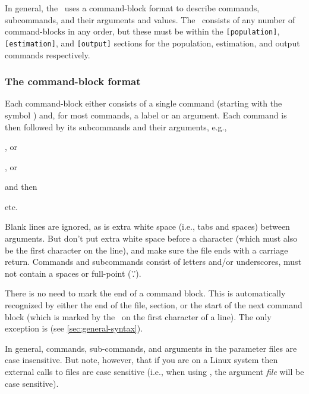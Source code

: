 In general, the \config\ uses a command-block format to describe commands, subcommands, and their arguments and values. The \config\ consists of any number of command-blocks in any order, but these must be within the \texttt{[population]}, \texttt{[estimation]}, and  \texttt{[output]} sections for the population, estimation, and output commands respectively. 

\subsubsection{The command-block format}

Each command-block either consists of a single command (starting with the symbol \@) and, for most commands, a label or an argument. Each command is then followed by its subcommands and their arguments, e.g., 

\begin{description}
\item {}, or 
\item {}, or
\item {}
\end{description}

and then
\begin{description}
\item {}
\item {}
\item etc.
\end{description}

Blank lines are ignored, as is extra white space (i.e., tabs and spaces) between arguments. But don't put extra white space before a \command{} character (which must also be the first character on the line), and make sure the file ends with a carriage return. Commands and subcommands consist of letters and/or underscores, must not contain a spaces or full-point ('.').

There is no need to mark the end of a command block. This is automatically recognized by either the end of the file, section, or the start of the next command block (which is marked by the \command{}\ on the first character of a line). The only exception is  (see \ref{sec:general-syntax}). 

In general, commands, sub-commands, and arguments in the parameter files are case insensitive. But note, however, that if you are on a Linux system then external calls to files are case sensitive (i.e., when using , the argument \emph{file} will be case sensitive). 

